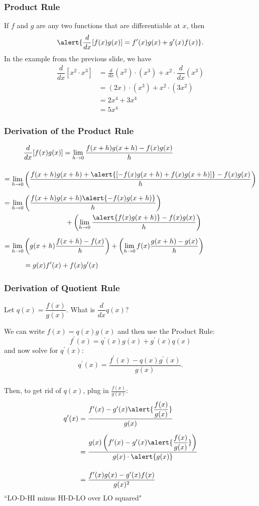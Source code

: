 \documentclass[14pt]{beamer}
\begin{document}
\begin{frame}
\frametitle{Product Rule}
\small
If $f$ and $g$ are any two functions that are differentiable at $x$, then
\[\alert{\frac{d}{dx}[f(x) g(x)] = f^{\prime}(x) g(x) + g^{\prime}(x) f(x)}.\]
In the example from the previous slide, we have
\begin{align*}
\dfrac{d}{dx}[x^2\cdot x^3] &= \frac{d}{dx}(x^2)\cdot (x^3)+x^2\cdot\dfrac{d}{dx}(x^3) \\
 &= (2x)\cdot (x^3)+x^2\cdot (3x^2) \\[0.25pc]
 &= 2x^4+3x^4 \\[0.25pc]
 &= 5x^4
\end{align*}
\end{frame}

\begin{frame}
\frametitle{Derivation of the Product Rule}
\footnotesize
\begin{align*}
&\dfrac{d}{dx}[f(x)g(x)] = \lim_{h \to 0} \frac{f(x+h)g(x+h)-f(x)g(x)}{h} \\[1pc]
 =\lim_{h \to 0} &\left(\frac{f(x+h)g(x+h)+\alert{[-f(x)g(x+h)+f(x)g(x+h)]}-f(x)g(x)}{h}\right) \\[0.5pc] 
 =\lim_{h \to 0} &\left(\frac{f(x+h)g(x+h)\alert{-f(x)g(x+h)}}{h}\right) \\
 &\hspace{5pc} + \left(\lim_{h \to 0}\frac{\alert{f(x)g(x+h)}-f(x)g(x)}{h}\right) \\[0.5pc]
 =\lim_{h \to 0} &\left(g(x+h) \frac{f(x+h)-f(x)}{h}\right) + \left(\lim_{h \to 0} f(x) \frac{g(x+h)-g(x)}{h}\right) \\[0.5pc]
 &=g(x)f^{\prime}(x)+f(x)g^{\prime}(x)
\end{align*}
\end{frame}

\begin{frame}
\frametitle{Derivation of Quotient Rule}
\small
\begin{que} Let $q(x)=\dfrac{f(x)}{g(x)}$.  What is $\dfrac{d}{dx}q(x)$? \end{que}
We can write $f(x)=q(x) g(x)$ and then use the Product Rule:
\[f^{\prime}(x) = q^{\prime}(x) g(x) + g^{\prime}(x) q(x)\] 
and now solve for $q^{\prime}(x)$: 
\[q^{\prime}(x)=\frac{f^{\prime}(x)-q(x)g^{\prime}(x)}{g(x)}.\]
\end{frame} 

\begin{frame}
\frametitle{}
\small
Then, to get rid of $q(x)$, plug in $\frac{f(x)}{g(x)}$:
\begin{align*}
q^{\prime}(x) &= \dfrac{f^{\prime}(x)-g^{\prime}(x)\alert{\dfrac{f(x)}{g(x)}}}{g(x)} \\[0.5pc]
 &= \frac{g(x) \left( f^{\prime}(x)-g^{\prime}(x) \alert{\dfrac{f(x)}{g(x)}} \right)}{g(x)\cdot\alert{g(x)}} \\[1pc]
 &=\frac{f^{\prime}(x) g(x)-g^{\prime}(x)f(x)}{g(x)^2}
\end{align*}
\alert{``LO-D-HI minus HI-D-LO  over LO squared"}
\end{frame}
\end{document}
